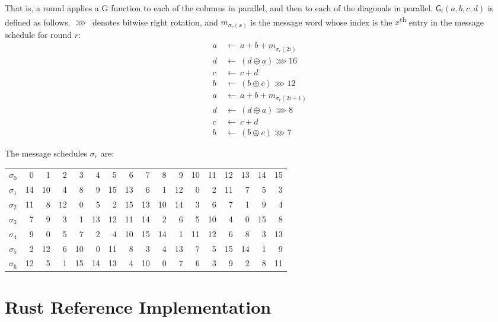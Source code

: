 \documentclass[11pt,notitlepage,a4paper]{article}
\newcommand{\GG}{\mathsf{G}}
\begin{document}
\begin{appendices}
    That is, a round applies a G function to each of the columns in parallel,
    and then to each of the diagonals in parallel. $\GG_i(a, b, c, d)$ is
    defined as follows. $\ggg$~denotes bitwise right rotation, and
    $m_{\sigma_r(x)}$ is the message word whose index is the
    $x$\textsuperscript{th} entry in the message schedule for round $r$:
\begin{align*}
    a \ & \leftarrow \ a + b + m_{\sigma_r(2i)} \\
    d \ & \leftarrow \ (d \oplus a) \ggg 16 \\
    c \ & \leftarrow \ c + d \\
    b \ & \leftarrow \ (b \oplus c) \ggg 12 \\
    a \ & \leftarrow \ a + b + m_{\sigma_r(2i+1)} \\
    d \ & \leftarrow \ (d \oplus a) \ggg 8 \\
    c \ & \leftarrow \ c + d \\
    b \ & \leftarrow \ (b \oplus c) \ggg 7
\end{align*}

    The message schedules $\sigma_r$ are:

\begin{center}
\begin{tabular}{ | r | r r r r r r r r r r r r r r r r | }
    \hline
    $\sigma_0$ & 0 & 1 & 2 & 3 & 4 & 5 & 6 & 7 & 8 & 9 & 10 & 11 & 12 & 13 & 14 & 15 \\
    $\sigma_1$ & 14 & 10 & 4 & 8 & 9 & 15 & 13 & 6 & 1 & 12 & 0 & 2 & 11 & 7 & 5 & 3 \\
    $\sigma_2$ & 11 & 8 & 12 & 0 & 5 & 2 & 15 & 13 & 10 & 14 & 3 & 6 & 7 & 1 & 9 & 4 \\
    $\sigma_3$ & 7 & 9 & 3 & 1 & 13 & 12 & 11 & 14 & 2 & 6 & 5 & 10 & 4 & 0 & 15 & 8 \\
    $\sigma_4$ & 9 & 0 & 5 & 7 & 2 & 4 & 10 & 15 & 14 & 1 & 11 & 12 & 6 & 8 & 3 & 13 \\
    $\sigma_5$ & 2 & 12 & 6 & 10 & 0 & 11 & 8 & 3 & 4 & 13 & 7 & 5 & 15 & 14 & 1 & 9 \\
    $\sigma_6$ & 12 & 5 & 1 & 15 & 14 & 13 & 4 & 10 & 0 & 7 & 6 & 3 & 9 & 2 & 8 & 11 \\
    \hline
\end{tabular}
\end{center}

\section{Rust Reference Implementation}\label{sec:referenceimpl}

\inputminted{rust}{reference_impl.rs}

\end{appendices}
\end{document}
